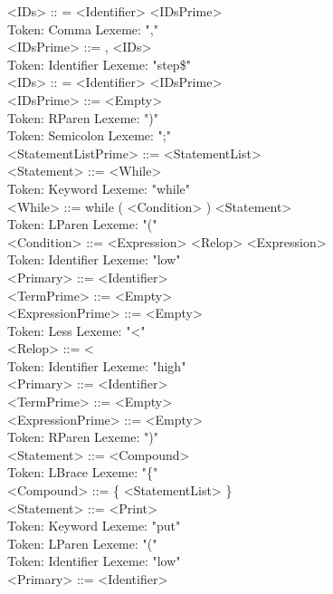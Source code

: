 \documentclass[11pt]{article}
\begin{document}
        <IDs> :: = <Identifier> <IDsPrime> \\
Token: Comma     Lexeme: "," \\
        <IDsPrime> ::= , <IDs> \\
Token: Identifier        Lexeme: "step\$" \\
        <IDs> :: = <Identifier> <IDsPrime> \\
        <IDsPrime> ::= <Empty> \\
Token: RParen    Lexeme: ")" \\
Token: Semicolon         Lexeme: ";" \\
        <StatementListPrime> ::= <StatementList> \\
        <Statement> ::= <While> \\
Token: Keyword   Lexeme: "while" \\
        <While> ::= while ( <Condition> ) <Statement> \\
Token: LParen    Lexeme: "(" \\
        <Condition> ::= <Expression> <Relop> <Expression> \\
Token: Identifier        Lexeme: "low" \\
        <Primary> ::= <Identifier> \\
        <TermPrime> ::= <Empty> \\
        <ExpressionPrime> ::= <Empty> \\
Token: Less      Lexeme: "<" \\
        <Relop> ::= < \\
Token: Identifier        Lexeme: "high" \\
        <Primary> ::= <Identifier> \\
        <TermPrime> ::= <Empty> \\
        <ExpressionPrime> ::= <Empty> \\
Token: RParen    Lexeme: ")" \\
        <Statement> ::= <Compound> \\
Token: LBrace    Lexeme: "\{" \\
        <Compound> ::= \{ <StatementList> \} \\
        <Statement> ::= <Print> \\
Token: Keyword   Lexeme: "put" \\
Token: LParen    Lexeme: "(" \\
Token: Identifier        Lexeme: "low" \\
        <Primary> ::= <Identifier> \\
\end{document}
